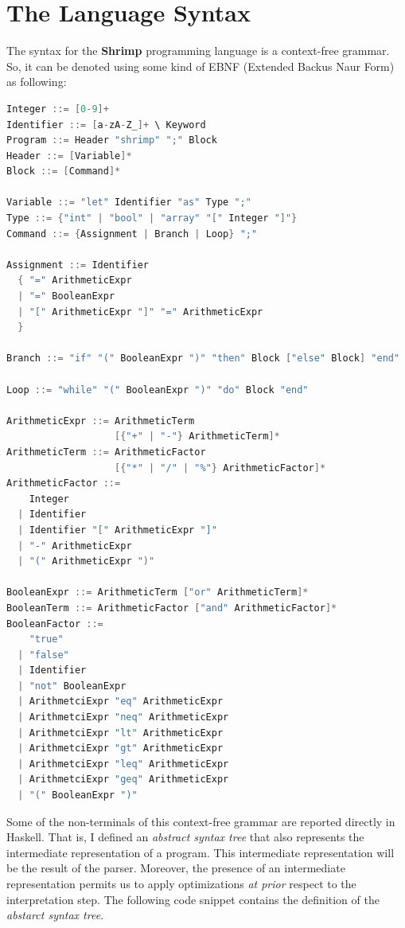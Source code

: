 \documentclass[12pt,a4paper]{article}
\begin{document}
\section*{The Language Syntax}
The syntax for the \textbf{Shrimp} programming language is a context-free grammar.
So, it can be denoted using some kind of EBNF (Extended Backus Naur Form) as following:
\begin{lstlisting}[language=C, style=custom-style]
Integer ::= [0-9]+
Identifier ::= [a-zA-Z_]+ \ Keyword
Program ::= Header "shrimp" ";" Block
Header ::= [Variable]*
Block ::= [Command]*

Variable ::= "let" Identifier "as" Type ";"
Type ::= {"int" | "bool" | "array" "[" Integer "]"}
Command ::= {Assignment | Branch | Loop} ";"

Assignment ::= Identifier
  { "=" ArithmeticExpr
  | "=" BooleanExpr
  | "[" ArithmeticExpr "]" "=" ArithmeticExpr
  }

Branch ::= "if" "(" BooleanExpr ")" "then" Block ["else" Block] "end"

Loop ::= "while" "(" BooleanExpr ")" "do" Block "end"

ArithmeticExpr ::= ArithmeticTerm
                   [{"+" | "-"} ArithmeticTerm]*
ArithmeticTerm ::= ArithmeticFactor
                   [{"*" | "/" | "%"} ArithmeticFactor]*
ArithmeticFactor ::=
    Integer
  | Identifier
  | Identifier "[" ArithmeticExpr "]"
  | "-" ArithmeticExpr
  | "(" ArithmeticExpr ")"

BooleanExpr ::= ArithmeticTerm ["or" ArithmeticTerm]*
BooleanTerm ::= ArithmeticFactor ["and" ArithmeticFactor]*
BooleanFactor ::=
    "true"
  | "false"
  | Identifier
  | "not" BooleanExpr
  | ArithmetciExpr "eq" ArithmeticExpr
  | ArithmetciExpr "neq" ArithmeticExpr
  | ArithmetciExpr "lt" ArithmeticExpr
  | ArithmetciExpr "gt" ArithmeticExpr
  | ArithmetciExpr "leq" ArithmeticExpr
  | ArithmetciExpr "geq" ArithmeticExpr
  | "(" BooleanExpr ")"
\end{lstlisting}
Some of the non-terminals of this context-free grammar are reported directly in Haskell.
That is, I defined an \textit{abstract syntax tree} that also represents the intermediate representation of a program.
This intermediate representation will be the result of the parser.
Moreover, the presence of an intermediate representation permits us to apply optimizations \textit{at prior} respect to the interpretation step.
The following code snippet contains the definition of the \textit{abstarct syntax tree}.
\end{document}

